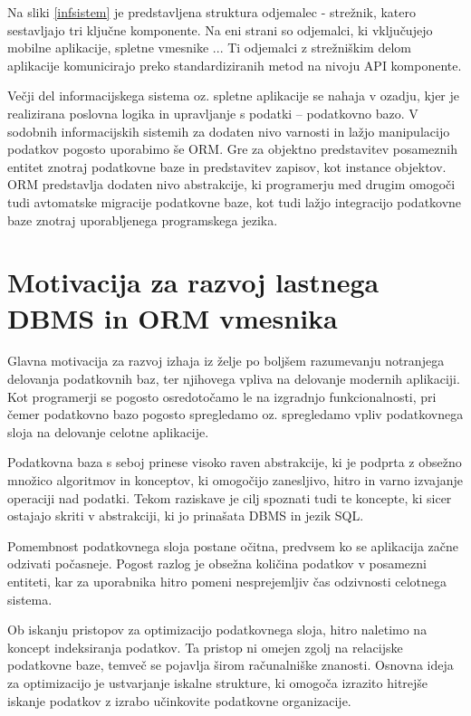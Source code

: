 \documentclass[a4paper,12pt,openright]{book}
\begin{document}
    \noindent
    Na sliki \ref{infsistem} je predstavljena struktura odjemalec - strežnik, katero sestavljajo tri ključne komponente. Na eni strani so odjemalci, ki vključujejo mobilne aplikacije, spletne vmesnike ... Ti odjemalci z strežniškim delom aplikacije komunicirajo preko standardiziranih metod na nivoju API komponente.

    Večji del informacijskega sistema oz. spletne aplikacije se nahaja v ozadju, kjer je realizirana poslovna logika in upravljanje s podatki – podatkovno bazo. V sodobnih informacijskih sistemih za dodaten nivo varnosti in lažjo manipulacijo podatkov pogosto uporabimo še ORM. Gre za objektno predstavitev posameznih entitet znotraj podatkovne baze in predstavitev zapisov, kot instance objektov. ORM predstavlja dodaten nivo abstrakcije, ki programerju med drugim omogoči tudi avtomatske migracije podatkovne baze, kot tudi lažjo integracijo podatkovne baze znotraj uporabljenega programskega jezika.

    \section{Motivacija za razvoj lastnega DBMS in ORM vmesnika}
    Glavna motivacija za razvoj izhaja iz želje po boljšem razumevanju notranjega delovanja podatkovnih baz, ter njihovega vpliva na delovanje modernih aplikaciji. Kot programerji se pogosto osredotočamo le na izgradnjo funkcionalnosti, pri čemer podatkovno bazo pogosto spregledamo oz. spregledamo vpliv podatkovnega sloja na delovanje celotne aplikacije.
    
    Podatkovna baza s seboj prinese visoko raven abstrakcije, ki je podprta z obsežno množico algoritmov in konceptov, ki omogočijo zanesljivo, hitro in varno izvajanje operaciji nad podatki. Tekom raziskave je cilj spoznati tudi te koncepte, ki sicer ostajajo skriti v abstrakciji, ki jo prinašata DBMS in jezik SQL.

    Pomembnost podatkovnega sloja postane očitna, predvsem ko se aplikacija začne odzivati počasneje. Pogost razlog je obsežna količina podatkov v posamezni entiteti, kar za uporabnika hitro pomeni nesprejemljiv čas odzivnosti celotnega sistema.

    Ob iskanju pristopov za optimizacijo podatkovnega sloja, hitro naletimo na koncept indeksiranja podatkov.
    Ta pristop ni omejen zgolj na relacijske podatkovne baze, temveč se pojavlja širom računalniške znanosti. Osnovna ideja za optimizacijo je ustvarjanje iskalne strukture, ki omogoča izrazito hitrejše iskanje podatkov z izrabo učinkovite podatkovne organizacije.
    
\end{document}
